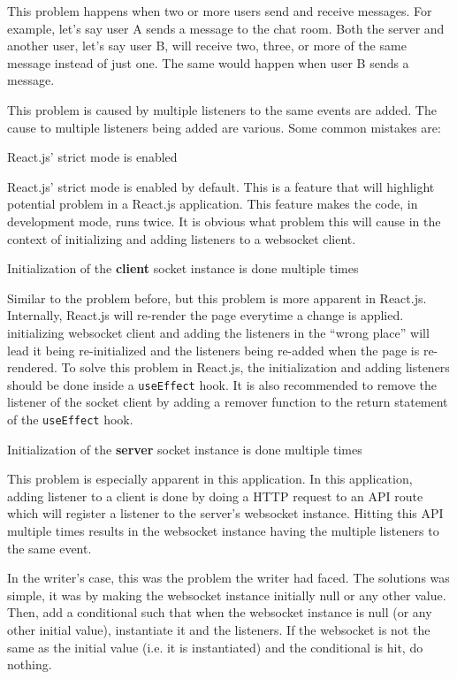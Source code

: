 \documentclass[conference]{IEEEtran}
\begin{document}
This problem happens when two or more users send and receive messages. For example,
let's say user A sends a message to the chat room. Both the server and another user,
let's say user B, will receive two, three, or more of the same message instead of
just one. The same would happen when user B sends a message.

This problem is caused by multiple listeners to the same events are added. The cause
to multiple listeners being added are various. Some common mistakes are:
\begin{IEEEitemize}
    \item{React.js' strict mode is enabled}

        React.js' strict mode is enabled by default. This is a feature that will
        highlight potential problem in a React.js application. This feature makes
        the code, in development mode, runs twice. It is obvious what problem this
        will cause in the context of initializing and adding listeners to a websocket
        client.

    \item{Initialization of the \textbf{client} socket instance is done multiple times}

        Similar to the problem before, but this problem is more apparent in React.js.
        Internally, React.js will re-render the page everytime a change is applied.
        initializing websocket client and adding the listeners in the ``wrong place''
        will lead it being re-initialized and the listeners being re-added when the
        page is re-rendered. To solve this problem in React.js, the initialization
        and adding listeners should be done inside a \texttt{useEffect} hook. It is
        also recommended to remove the listener of the socket client by adding a remover
        function to the return statement of the \texttt{useEffect} hook.

    \item{Initialization of the \textbf{server} socket instance is done multiple times}

        This problem is especially apparent in this application. In this application,
        adding listener to a client is done by doing a HTTP request to an API route which
        will register a listener to the server's websocket instance. Hitting this API
        multiple times results in the websocket instance having the multiple listeners
        to the same event.

        In the writer's case, this was the problem the writer had faced.
        The solutions was simple, it was by making the websocket instance initially
        null or any other value. Then, add a conditional such that when the websocket
        instance is null (or any other initial value), instantiate it and the listeners.
        If the websocket is not the same as the initial value (i.e. it is instantiated)
        and the conditional is hit, do nothing.
\end{IEEEitemize}
\end{document}
